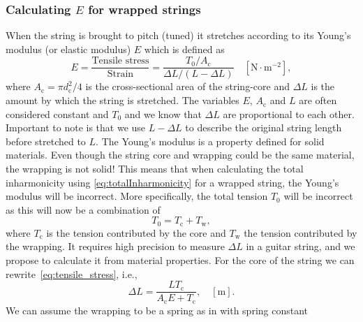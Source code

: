 \documentclass{article}
\begin{document}
\begin{sloppy}
\subsubsection{Calculating $E$ for wrapped strings}%
%
When the string is brought to pitch (tuned) it stretches according to its Young's modulus (or elastic modulus) $E$ which is defined as
%
\begin{equation}\label{eq:tensile_stress}
    E = \frac{\text{Tensile stress}}{\text{Strain}}
    = \frac{T_0/A_\text{c}}{\Delta L/(L - \Delta L)} \quad [\text{N}\cdot\text{m}^{-2}], 
\end{equation}
%
where $A_\text{c} = \pi d_\text{c}^2/4$ is the cross-sectional area of the string-core and $\Delta L$ is the amount by which the string is stretched. The variables $E$, $A_\text{c}$ and $L$ are often considered constant and $T_0$ and we know that $\Delta L$ are proportional to each other. Important to note is that we use $L - \Delta L$ to describe the original string length before stretched to $L$. The Young's modulus is a property defined for solid materials. Even though the string core and wrapping could be the same material, the wrapping is not solid! This means that when calculating the total inharmonicity using \eqref{eq:totalInharmonicity} for a wrapped string, the Young's modulus will be incorrect. %
More specifically, the total tension $T_0$ will be incorrect as this will now be a combination of
\begin{equation}\label{eq:totalTension}
    T_0 = T_\text{c} + T_\text{w},
\end{equation}
where $T_\text{c}$ is the tension contributed by the core and $T_\text{w}$ the tension contributed by the wrapping. %
%
It requires high precision to measure $\Delta L$ in a guitar string, and we propose to calculate it from material properties. For the core of the string we can rewrite~\eqref{eq:tensile_stress}, i.e.,
%
\begin{equation}\label{eq:deltaL}
    \Delta L= \frac{LT_\text{c}}{A_\text{c}E + T_\text{c}}, \quad  [\text{m}]. 
\end{equation}
%
We can assume the wrapping to be a spring as in \cite{kemp:wound_and_unwound_strings} with spring constant ~\cite{childs:mechanical_engineering}

\end{sloppy}
\end{document}
